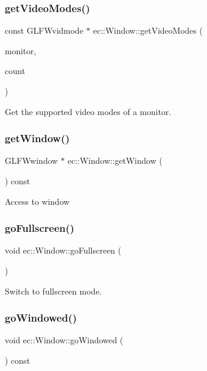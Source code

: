 \subsubsection{\texorpdfstring{get\+Video\+Modes()}{getVideoModes()}}
{\footnotesize\ttfamily const G\+L\+F\+Wvidmode $\ast$ ec\+::\+Window\+::get\+Video\+Modes (\begin{DoxyParamCaption}\item[{G\+L\+F\+Wmonitor $\ast$}]{monitor,  }\item[{int $\ast$}]{count }\end{DoxyParamCaption})\hspace{0.3cm}{\ttfamily [static]}}

Get the supported video modes of a monitor. \mbox{\label{classec_1_1_window_abe525ce2f27fecf298b1ad0926024ae3}} 
\subsubsection{\texorpdfstring{get\+Window()}{getWindow()}}
{\footnotesize\ttfamily G\+L\+F\+Wwindow $\ast$ ec\+::\+Window\+::get\+Window (\begin{DoxyParamCaption}{ }\end{DoxyParamCaption}) const}

Access to window \mbox{\label{classec_1_1_window_ab89e0e27d169da6f5d9430b78c77c0ee}} 
\subsubsection{\texorpdfstring{go\+Fullscreen()}{goFullscreen()}}
{\footnotesize\ttfamily void ec\+::\+Window\+::go\+Fullscreen (\begin{DoxyParamCaption}{ }\end{DoxyParamCaption})}

Switch to fullscreen mode. \mbox{\label{classec_1_1_window_aeeaa47b1f8199b4df60f74aa3b2c45f7}} 
\subsubsection{\texorpdfstring{go\+Windowed()}{goWindowed()}}
{\footnotesize\ttfamily void ec\+::\+Window\+::go\+Windowed (\begin{DoxyParamCaption}{ }\end{DoxyParamCaption}) const}

